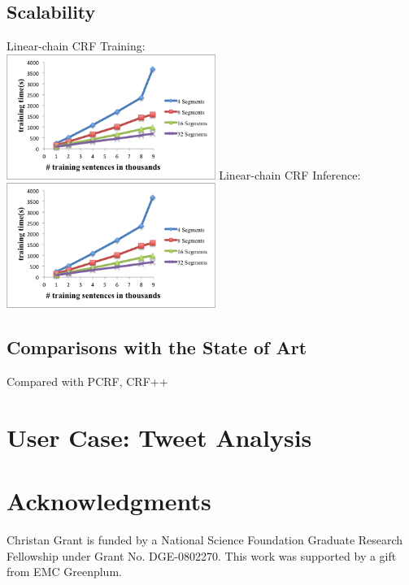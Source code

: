 \documentclass[11pt,letterpaper]{article}
\begin{document}
\subsection{Scalability}
Linear-chain CRF Training:\\
\includegraphics[height=11em]{training}
Linear-chain CRF Inference:\\
\includegraphics[height=11em]{training}
\subsection{Comparisons with the State of Art}
Compared with PCRF, CRF++

\section{User Case: Tweet Analysis}
\label{sec:blind}


\section*{Acknowledgments}
Christan Grant is funded by a National
Science Foundation Graduate Research Fellowship under Grant No. DGE-0802270.
This work was supported by a gift from EMC Greenplum.



\end{document}
